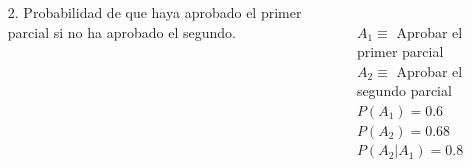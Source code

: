 \documentclass[aspectratio=149,10pt,t]{beamer}
\begin{document}
\begin{frame}
	\begin{columns}
		\begin{column}[T]{0.6\textwidth}
			\begin{enumerate}
			  \item[2.] Probabilidad de que haya aprobado el primer parcial si no ha aprobado el segundo.
		  \end{enumerate}
		\end{column}
		\begin{column}[T]{0.4\textwidth}
			\\
			$A_1 \equiv$ Aprobar el primer parcial\\
			$A_2 \equiv$ Aprobar el segundo parcial\\
			$P(A_1)=0.6$\\
			$P(A_2)=0.68$\\
			$P(A_2|A_1)=0.8$
		\end{column}
	\end{columns}
\end{frame}
\end{document}
